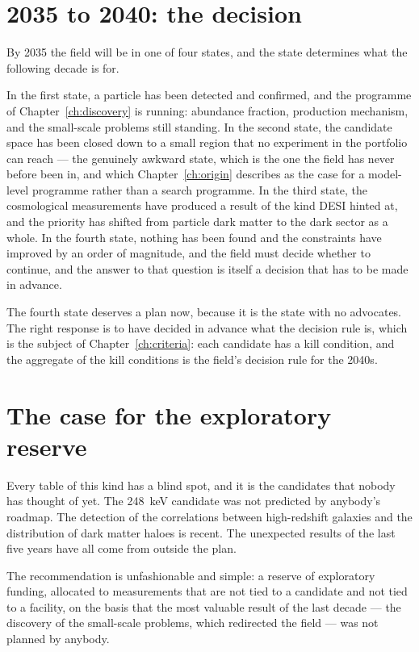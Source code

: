 \section{2035 to 2040: the decision}By 2035 the field will be in one of four
states, and the state determines what the following decade is for.

In the first state, a particle has been detected and confirmed, and the
programme of Chapter~\ref{ch:discovery} is running: abundance fraction,
production mechanism, and the small-scale problems still standing. In the
second state, the candidate space has been closed down to a small region
that no experiment in the portfolio can reach --- the genuinely awkward
state, which is the one the field has never before been in, and which
Chapter~\ref{ch:origin} describes as the case for a model-level programme
rather than a search programme. In the third state, the cosmological
measurements have produced a result of the kind DESI hinted at, and the
priority has shifted from particle dark matter to the dark sector as a
whole. In the fourth state, nothing has been found and the constraints have
improved by an order of magnitude, and the field must decide whether to
continue, and the answer to that question is itself a decision that has to
be made in advance.

The fourth state deserves a plan now, because it is the state with no
advocates. The right response is to have decided in advance what the
decision rule is, which is the subject of Chapter~\ref{ch:criteria}: each
candidate has a kill condition, and the aggregate of the kill conditions is
the field's decision rule for the 2040s.

\section{The case for the exploratory reserve}Every table of this kind has a blind
spot, and it is the candidates that nobody has thought of yet. The 248~keV
candidate was not predicted by anybody's roadmap. The detection of the
correlations between high-redshift galaxies and the distribution of dark
matter haloes is recent. The unexpected results of the last five years have
all come from outside the plan.

The recommendation is unfashionable and simple: a reserve of exploratory
funding, allocated to measurements that are not tied to a candidate and not
tied to a facility, on the basis that the most valuable result of the last
decade --- the discovery of the small-scale problems, which redirected the
field --- was not planned by anybody.

